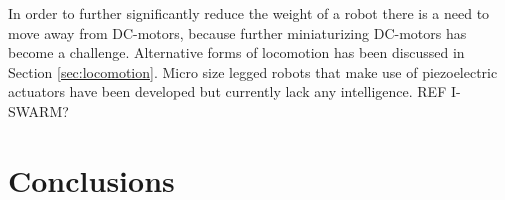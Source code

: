 
In order to further significantly reduce the weight of a robot there is a need to move away from DC-motors, because further miniaturizing DC-motors has become a challenge.
Alternative forms of locomotion has been discussed in Section \ref{sec:locomotion}.
Micro size legged robots that make use of piezoelectric actuators have been developed but currently lack any intelligence. REF I-SWARM?



\section{Conclusions}
